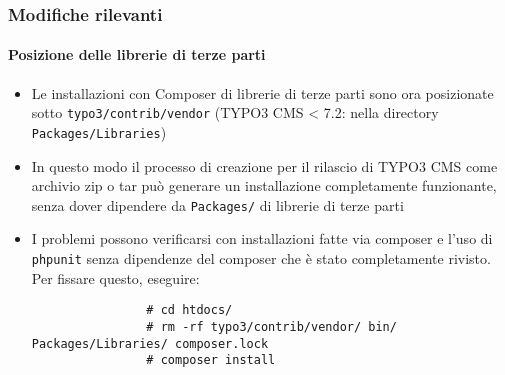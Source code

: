\begin{frame}[fragile]
	\frametitle{Modifiche rilevanti}
	\framesubtitle{Posizione delle librerie di terze parti}

	\begin{itemize}

		\item Le installazioni con Composer di librerie di terze parti sono ora posizionate sotto \texttt{typo3/contrib/vendor}\newline
			\small
				(TYPO3 CMS < 7.2: nella directory \texttt{Packages/Libraries})
			\normalsize

		\item In questo modo il processo di creazione per il rilascio di TYPO3 CMS come archivio zip o tar 
				può generare un installazione completamente funzionante, senza dover dipendere da \texttt{Packages/} di librerie di terze parti

		\item I problemi possono verificarsi con installazioni fatte via composer e l'uso di \texttt{phpunit}
			senza dipendenze del composer che è stato completamente rivisto. Per fissare questo, eseguire:

			\begin{lstlisting}
				# cd htdocs/
				# rm -rf typo3/contrib/vendor/ bin/ Packages/Libraries/ composer.lock
				# composer install
			\end{lstlisting}
	\end{itemize}

\end{frame}

